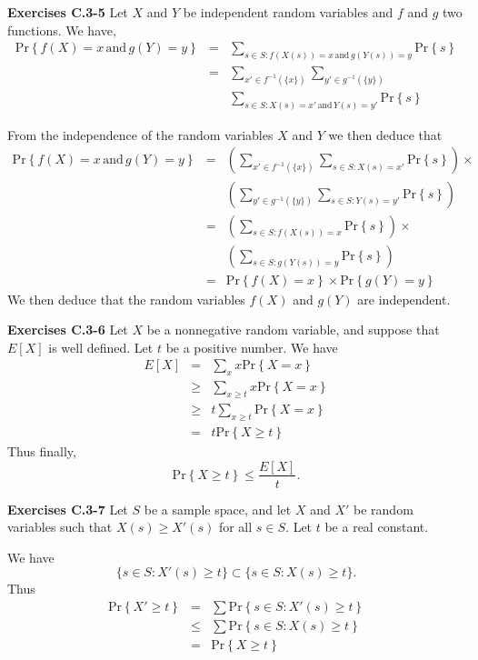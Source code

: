 \documentclass[a4paper,12pt]{article}
\newcommand{\newpar}[1]
{\bigskip \noindent \textbf{Exercises #1} \newline}
\newcommand{\prob}[1]{\mathrm{Pr}\left\{ #1 \right\}}
\begin{document}
\newpar{C.3-5}
Let $X$ and $Y$ be independent random variables and $f$ and $g$ two
functions.   We have,
\begin{eqnarray*}
    \prob{f(X) = x\,\mbox{and}\,g(Y) = y} &=& \sum_{s \in S: f(X(s)) =
     x\,\mbox{and}\,g(Y(s)) = y}\prob{s} \\
    &=& \sum_{x' \in f^{-1}\left(\{x\}\right)} \sum_{y' \in
      g^{-1}\left(\{y\}\right)} \\ && \sum_{s \in S: X(s) =
      x'\,\mbox{and}\,Y(s) = y'} \prob{s}
\end{eqnarray*}

From the independence of the random variables $X$ and $Y$ we then
deduce that
\begin{eqnarray*}
  \prob{f(X) = x\,\mbox{and}\,g(Y) = y} &=& \left( \sum_{x' \in
    f^{-1}\left(\{x\}\right)} \sum_{s \in S: X(s) = x'} \prob{s}
  \right) \times \\
  && \left( \sum_{y' \in
    g^{-1}\left(\{y\}\right)} \sum_{s \in S: Y(s) = y'} \prob{s}
  \right) \\
  &=& \left( \sum_{s \in S: f(X(s)) = x} \prob{s} \right) \times \\ &&
  \left( \sum_{s \in S: g(Y(s)) = y} \prob{s} \right) \\
  &=& \prob{f(X) =  x} \times \prob{g(Y) = y}
\end{eqnarray*}
We then deduce that the random variables $f(X)$ and $g(Y)$ are
independent.

\newpar{C.3-6}
Let $X$ be a nonnegative random variable, and suppose that $E[X]$ is
well defined.  Let $t$ be a positive number.  We have
\begin{eqnarray*}
  E[X] &=& \sum_x x \prob{X=x} \\
  &\ge& \sum_{x \ge t} x \prob{X=x} \\
  &\ge& t \sum_{x \ge t} \prob{X=x} \\
  &=& t \prob{X \ge t}
\end{eqnarray*}
Thus finally,
\[ \prob{X \ge t} \le \frac{E[X]}{t}.\]

\newpar{C.3-7}
Let $S$ be a sample space, and let $X$ and $X'$ be random variables
such that $X(s) \ge X'(s)$ for all $s \in S$.   Let $t$ be a real
constant.

We have
\[ \{ s \in S: X'(s) \ge t \} \subset \{ s \in S: X(s) \ge t \}.\]
Thus
\begin{eqnarray*}
  \prob{X' \ge t} &=& \sum \prob{s \in S: X'(s) \ge t} \\
  &\le& \sum \prob{s \in S: X(s) \ge t} \\
  &=& \prob{X \ge t}
\end{eqnarray*}
\end{document}
